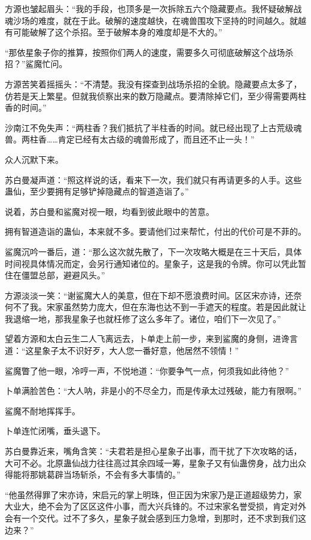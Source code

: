 \begin{this_body}
方源也皱起眉头：“我的手段，也顶多是一次拆除五六个隐藏要点。我怀疑破解战魂沙场的难度，就在于此。破解的速度越快，在魂兽围攻下坚持的时间越久。就越有可能破解了这个杀招。至于破解本身的难度却是不大的。”

“那依星象子你的推算，按照你们两人的速度，需要多久可彻底破解这个战场杀招？”鲨魔忙问。

方源苦笑着摇摇头：“不清楚。我没有探查到战场杀招的全貌。隐藏要点太多了，仿若是天上繁星。但就我侦察出来的数万隐藏点。要清除掉它们，至少得需要两柱香的时间。”

沙南江不免失声：“两柱香？我们抵抗了半柱香的时间。就已经出现了上古荒级魂兽。两柱香……肯定已经有太古级的魂兽形成了，而且还不止一头！”

众人沉默下来。

苏白曼凝声道：“照这样说的话，看来下一次，我们就只有再请更多的人手。这些蛊仙，至少要拥有足够铲掉隐藏点的智道造诣了。”

说着，苏白曼和鲨魔对视一眼，均看到彼此眼中的苦意。

拥有智道造诣的蛊仙，本来就不多。要请他们过来帮忙，付出的代价可是不菲的。

鲨魔沉吟一番后，道：“那么这次就先散了，下一次攻略大概是在三十天后，具体时间视具体情况而定，会另行通知诸位的。星象子，这是我的令牌。你可以凭此暂住在僵盟总部，避避风头。”

方源淡淡一笑：“谢鲨魔大人的美意，但在下却不愿浪费时间。区区宋亦诗，还奈何不了我。宋家虽然势力庞大，但在东海也达不到一手遮天的程度。若是因此就让我退缩一地，那我星象子也就枉修了这么多年了。诸位，咱们下一次见了。”

望着方源和太白云生二人飞离远去，卜单走上前一步，来到鲨魔的身侧，进谗言道：“这星象子太不识好歹，大人您一番好意，他居然不领情！”

鲨魔瞥了他一眼，冷哼一声，不悦地道：“你要争气一点，何须我如此待他？”

卜单满脸苦色：“大人呐，非是小的不尽全力，而是传承太过残破，能力有限啊。”

鲨魔不耐地挥挥手。

卜单连忙闭嘴，垂头退下。

苏白曼靠近来，嘴角含笑：“夫君若是担心星象子出事，而干扰了下次攻略的话，大可不必。北原蛊仙战力往往高过其余四域一筹，星象子又有仙蛊傍身，战力出众得能将那姚葛辟当场斩杀，不会有多大事情的。”

“他虽然得罪了宋亦诗，宋启元的掌上明珠，但正因为宋家乃是正道超级势力，家大业大，绝不会为了区区这件小事，而大兴兵锋的。不过宋家名誉受损，肯定对外会有一个交代。过不了多久，星象子就会感到压力急增，到那时，还不求到我们这边来？”


\end{this_body}
